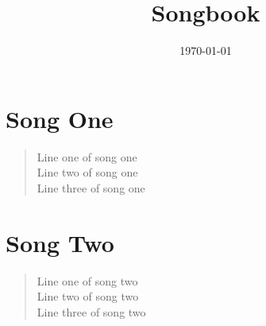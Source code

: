 \documentclass{article}%
\title{Songbook}%
\author{}%
\date{\today}%
\begin{document}
%
\normalsize%
\maketitle%
\section*{Song One}%
\label{sec:SongOne}%
\begin{verse}%
Line one of song one \\ Line two of song one \\ Line three of song one%
\end{verse}

%
\section*{Song Two}%
\label{sec:SongTwo}%
\begin{verse}%
Line one of song two \\ Line two of song two \\ Line three of song two%
\end{verse}

%
\end{document}
